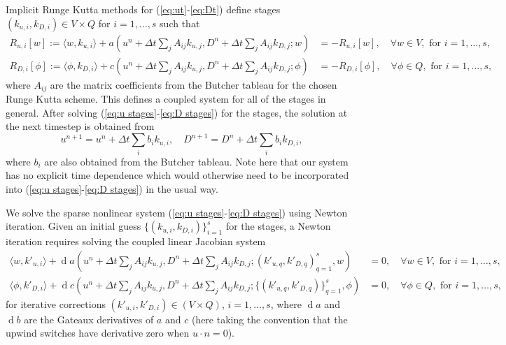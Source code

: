 \documentclass[a4paper]{article}
\DeclareMathOperator{\diff}{d}
\begin{document}
Implicit Runge Kutta methods for (\ref{eq:ut}-\ref{eq:Dt}) define
stages $(k_{u,i}, k_{D,i})\in V\times Q$ for $i=1,\ldots,s$ such that
\begin{align}
  \label{eq:u stages}
  R_{u,i}[w] := \langle w, k_{u,i} \rangle + a\left(u^n + \Delta t\sum_jA_{ij}k_{u,j},
  D^n + \Delta t\sum_jA_{ij}k_{D,j};w\right)
   & = -R_{u,i}[w],
  \quad \forall w \in V,\mbox{ for }i=1,\ldots,s, \\
  \label{eq:D stages}
  R_{D,i}[\phi] := \langle \phi, k_{D,i} \rangle + c\left(u^n + \Delta
  t\sum_jA_{ij}k_{u,j}, D^n + \Delta t\sum_jA_{ij}k_{D,j}; \phi\right)
  & = -R_{D,i}[\phi], \quad \forall \phi \in Q,\mbox{ for
  }i=1,\ldots,s,
\end{align}
where $A_{ij}$ are the matrix coefficients from the Butcher
tableau for the chosen Runge Kutta scheme. This defines a coupled
system for all of the stages in general. After solving
(\ref{eq:u stages}-\ref{eq:D stages}) for the stages, the solution
at the next timestep is obtained from
\begin{equation}
  u^{n+1} = u^n + \Delta t\sum_ib_i k_{u,i},\quad
  D^{n+1} = D^n + \Delta t\sum_ib_i k_{D,i},
\end{equation}
where $b_i$ are also obtained from the Butcher tableau. Note here
that our system has no explicit time dependence which would otherwise
need to be incorporated into (\ref{eq:u stages}-\ref{eq:D stages}) in
the usual way.

We solve the sparse nonlinear system (\ref{eq:u stages}-\ref{eq:D
  stages}) using Newton iteration. Given an initial guess $\{(k_{u,i},
k_{D,i})\}_{i=1}^s$ for the stages, a Newton iteration requires solving
the coupled linear Jacobian system
\begin{align}
  \label{eq:u J}
  \langle w, k'_{u,i} \rangle + \diff a\left(u^n + \Delta t\sum_jA_{ij}k_{u,j},
  D^n + \Delta t\sum_jA_{ij}k_{D,j};{(k'_{u,q}, k'_{D,q})}_{q=1}^s,
  w\right)
   & = 0,
  \quad \forall w \in V,\mbox{ for }i=1,\ldots,s, \\
  \label{eq:D J}
  \langle \phi, k'_{D,i} \rangle
  + \diff c\left(u^n + \Delta t\sum_jA_{ij}k_{u,j},
  D^n + \Delta t\sum_jA_{ij}k_{D,j};\{(k'_{u,q}, k'_{D,q})\}_{q=1}^s,
  \phi\right) & =
 0, \quad \forall \phi \in Q,\mbox{ for }i=1,\ldots,s,
\end{align}
for iterative corrections $(k'_{u,i}, k'_{D,i})\in (V\times Q)$,
$i=1,\ldots,s$, where $\diff a$ and $\diff b$ are the Gateaux
derivatives of $a$ and $c$ (here taking the convention that the upwind
switches have derivative zero when $u\cdot n=0$).
\end{document}
